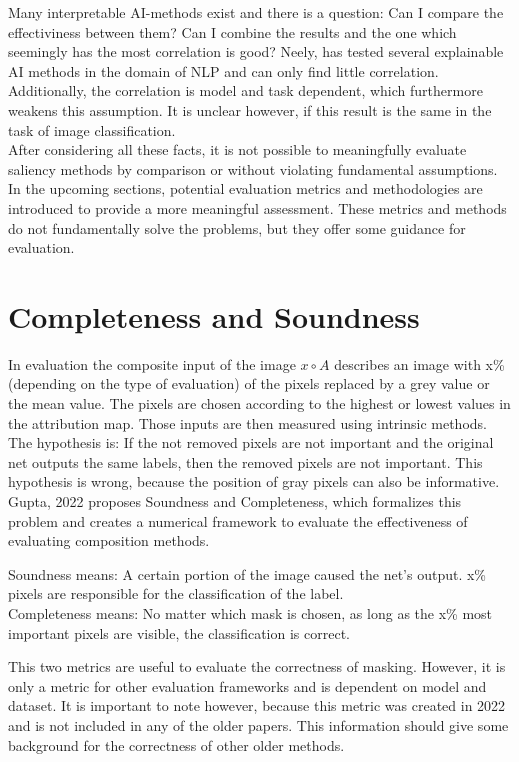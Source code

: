 Many interpretable AI-methods exist and there is a question: Can I compare the effectiviness between them? Can I combine the results and the one which seemingly has the most correlation is good? Neely, \cite{neely2021order} has tested several explainable AI methods in the domain of NLP and can only find little correlation. Additionally, the correlation is model and task dependent, which furthermore weakens this assumption. It is unclear however, if this result is the same in the task of image classification.
\\

After considering all these facts, it is not possible to meaningfully evaluate saliency methods by comparison or without violating fundamental assumptions. In the upcoming sections, potential evaluation metrics and methodologies are introduced to provide a more meaningful assessment. These metrics and methods do not fundamentally solve the problems, but they offer some guidance for evaluation.

\section{Completeness and Soundness}

In evaluation the composite input of the image $x \circ A$ describes an image with x\% (depending on the type of evaluation) of the pixels replaced by a grey value or the mean value. The pixels are chosen according to the highest or lowest values in the attribution map. Those inputs are then measured using intrinsic methods. The hypothesis is: If the not removed pixels are not important and the original net outputs the same labels, then the removed pixels are not important. This hypothesis is wrong, because the position of gray pixels can also be informative.
Gupta, 2022 \cite{gupta2022new} proposes Soundness and Completeness, which formalizes this problem and creates a numerical framework to evaluate the effectiveness of evaluating composition methods.

Soundness means: A certain portion of the image caused the net's output. x\% pixels are responsible for the classification of the label.\\
Completeness means: No matter which mask is chosen, as long as the x\% most important pixels are visible, the classification is correct.

This two metrics are useful to evaluate the correctness of masking. However, it is only a metric for other evaluation frameworks and is dependent on model and dataset. It is important to note however, because this metric was created in 2022 and is not included in any of the older papers. This information should give some background for the correctness of other older methods.

